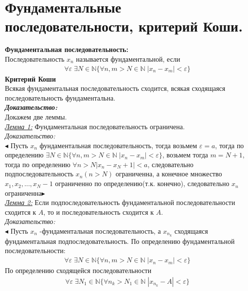 \section{Фундаментальные последовательности, критерий Коши.}

\textbf{Фундаментальная последовательность:}  \\
Последовательность $ {x_n} $ называется фундаментальной, если 
\begin{align*}
\forall \varepsilon \; \exists N \in \mathbb{N} \{\forall n,m> N \in \mathbb{N} \; |x_n-x_m|<\varepsilon\} 
\end{align*}
\textbf{Критерий Коши}\\
 Всякая фундаментальная последовательность сходится, всякая сходящаяся последовательность фундаментальна.\\
\textbf{\textit{ Доказательство:}}\\
Докажем две леммы.\\
\underline{\textit{Лемма 1:}} Фундаментальная последовательность ограничена.\\
\textit{Доказательство:}\\$\blacktriangleleft$
Пусть $x_n $ фундаментальная последовательность, тогда возьмем $ \varepsilon = a $, тогда по определению $ \exists N \in \mathbb{N} \{\forall n,m> N \in \mathbb{N} \; |x_n-x_m|<\varepsilon\} $, возьмем тогда $ m= N+1 $, тогда по определению  $\forall n>N |x_n-x_N+1|<a $, следовательно подпоследовательность $ x_n(n>N) $ ограниченна, а конечное множество $ x_1,x_2,...,x_N-1 $ ограниченно по определению(т.к. конечно), следовательно $ x_n $ ограниченна$\blacktriangleright$\\ 
\underline{\textit{Лемма 2:}} Если подпоследовательность фундаментальной последовательности сходится к $A$, то и последовательность сходится к $A$.\\
\textit{Доказательство:}\\$\blacktriangleleft$
Пусть $ x_n $ -фундаментальная последовательность, а $ x_{n_{k}}  $ сходящаяся фундаментальная подпоследовательность.
По определению фундаментальной последовательности:
\begin{align*}
\forall \varepsilon \; \exists N \in \mathbb{N} \{\forall n,m> N \in \mathbb{N} \; |x_n-x_m|<\varepsilon\}
\end{align*}
По определению сходящейся последовательности 
\begin{align*}
\forall \varepsilon \; \exists N_1 \in \mathbb{N} \{\forall n_{k}> N_1 \in \mathbb{N} \; |x_{n_{k}}-A|<\varepsilon\}
\end{align*}
